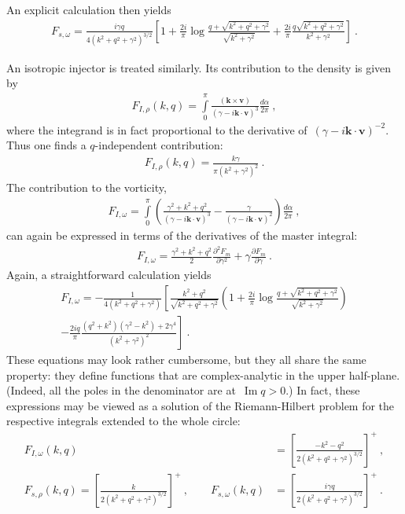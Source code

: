\documentclass[preprint,aps,eqsecnum]{revtex4-1}
\renewcommand{\Im}{\mathop{\mathrm{Im}}\nolimits}
\begin{document}
An explicit calculation then yields
\begin{align}
  F_{s, \omega} =
 \frac{i \gamma q}{4(k^2 + q^2 + \gamma^2)^{3/2}}
  \left[1 + \frac{2i}{\pi} \log \frac{q + \sqrt{k^2 + q^2 + \gamma^2}}{
                          \sqrt{k^2 + \gamma^2}}
  + \frac{2i}{\pi} \frac{q\sqrt{k^2 + q^2 + \gamma^2}}{k^2 + \gamma^2}
  \right]\ . 
\end{align}

An isotropic injector is treated similarly.
Its contribution to the density is given by
\begin{align}
  F_{I, \rho}(k, q) = \int\limits_{0}^{\pi} \frac{({\bm k}\times{\bm v})}{
     \left(\gamma - i {\bm k} \cdot{\bm v}\right)^3} \frac{d\alpha}{2\pi}\ , 
\end{align}
where the integrand is in fact proportional to the derivative
of~$(\gamma - i {\bm k}\cdot{\bm v})^{-2}$. Thus one finds
a $q$-independent contribution:
\begin{align}
  F_{I, \rho}(k, q) = \frac{k\gamma}{\pi (k^2 + \gamma^2)^2}\ . 
\end{align}
The contribution to the vorticity,
\begin{align}
  F_{I, \omega} = \int\limits_{0}^{\pi} \left(
  \frac{\gamma^2 + k^2 + q^2}{\left(\gamma - i {\bm k}\cdot{\bm v}\right)^3}
  - \frac{\gamma}{\left(\gamma - i {\bm k}\cdot{\bm v}\right)^2}
  \right)
  \frac{d\alpha}{2\pi}\ , 
\end{align}
can again be expressed in terms of the derivatives of the master integral:
\begin{align}
  F_{I, \omega} = \frac{\gamma^2 + k^2 + q^2}{2}
  \frac{\partial^2 F_m}{\partial \gamma^2}
  + \gamma \frac{\partial F_m}{\partial\gamma}\ . 
\end{align}
Again, a straightforward calculation yields
\begin{align}
  F_{I, \omega} = -\frac{1}{4 \left(k^2 + q^2 + \gamma^2\right)}
  \left[
  \frac{k^2 + q^2}{\sqrt{k^2 + q^2 + \gamma^2}}
  \left(
  1 + \frac{2i}{\pi} \log\frac{q + \sqrt{k^2 + q^2 + \gamma^2}}{
                           \sqrt{k^2 + \gamma^2}}
  \right) \right. \\ \nonumber
  - \left.\frac{2iq}{\pi} \frac{(q^2 + k^2)(\gamma^2 - k^2) + 2 \gamma^4}{
  (k^2 + \gamma^2)^2}
  \right]\ . 
\end{align}
These equations may look rather cumbersome, but they all share the same
property: they define functions that are complex-analytic in the upper
half-plane. (Indeed, all the poles in the denominator are at~$\Im q > 0$.)
In fact, these expressions may be viewed as a solution of the
Riemann-Hilbert problem for the respective integrals
extended to the whole circle:
\begin{align}
  F_{I, \omega}(k, q) &= \left[\frac{-k^2 - q^2}{
  2\left(k^2 + q^2 + \gamma^2\right)^{3/2}}\right]^{+}\ , \\
  F_{s, \rho}(k, q)
  = \left[\frac{k}{2(k^2 + q^2 + \gamma^2)^{3/2}}\right]^{+}\ , 
  \qquad
  F_{s, \omega}(k, q) &= \left[\frac{i \gamma q}{
          2\left(k^2 + q^2 + \gamma^2\right)^{3/2}}\right]^{+}\ . 
\end{align}
\end{document}
